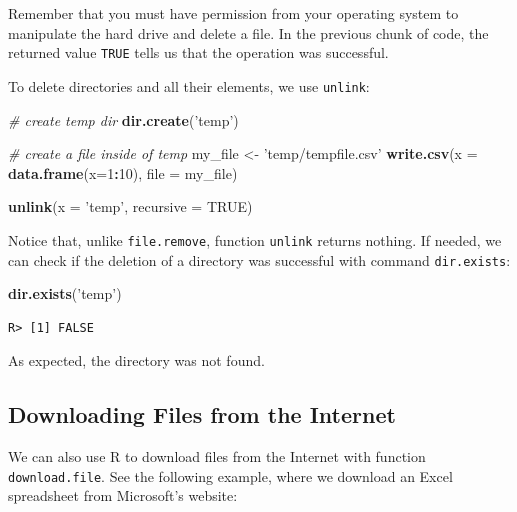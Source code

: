 \documentclass[
  12pt,
]{book}
\newenvironment{Shaded}{\begin{snugshade}}{\end{snugshade}}
\newcommand{\CommentTok}[1]{\textcolor[rgb]{0.37,0.37,0.37}{\textit{#1}}}
\newcommand{\DataTypeTok}[1]{\textcolor[rgb]{0.27,0.27,0.27}{#1}}
\newcommand{\DecValTok}[1]{\textcolor[rgb]{0.06,0.06,0.06}{#1}}
\newcommand{\KeywordTok}[1]{\textcolor[rgb]{0.27,0.27,0.27}{\textbf{#1}}}
\newcommand{\NormalTok}[1]{#1}
\newcommand{\OperatorTok}[1]{\textcolor[rgb]{0.43,0.43,0.43}{\textbf{#1}}}
\newcommand{\OtherTok}[1]{\textcolor[rgb]{0.37,0.37,0.37}{#1}}
\newcommand{\StringTok}[1]{\textcolor[rgb]{0.5,0.5,0.5}{#1}}
\begin{document}
Remember that you must have permission from your operating system to manipulate the hard drive and delete a file. In the previous chunk of code, the returned value \texttt{TRUE} tells us that the operation was successful.

To delete directories and all their elements, we use \texttt{unlink}:

\begin{Shaded}
\begin{Highlighting}[]
\CommentTok{# create temp dir}
\KeywordTok{dir.create}\NormalTok{(}\StringTok{'temp'}\NormalTok{)}

\CommentTok{# create a file inside of temp}
\NormalTok{my_file <-}\StringTok{ 'temp/tempfile.csv'}
\KeywordTok{write.csv}\NormalTok{(}\DataTypeTok{x =} \KeywordTok{data.frame}\NormalTok{(}\DataTypeTok{x=}\DecValTok{1}\OperatorTok{:}\DecValTok{10}\NormalTok{),}
          \DataTypeTok{file =}\NormalTok{ my_file)}

\KeywordTok{unlink}\NormalTok{(}\DataTypeTok{x =} \StringTok{'temp'}\NormalTok{, }\DataTypeTok{recursive =} \OtherTok{TRUE}\NormalTok{)}
\end{Highlighting}
\end{Shaded}

Notice that, unlike \texttt{file.remove}, function \texttt{unlink} returns nothing. If needed, we can check if the deletion of a directory was successful with command \texttt{dir.exists}:

\begin{Shaded}
\begin{Highlighting}[]
\KeywordTok{dir.exists}\NormalTok{(}\StringTok{'temp'}\NormalTok{)}
\end{Highlighting}
\end{Shaded}

\begin{verbatim}
R> [1] FALSE
\end{verbatim}

As expected, the directory was not found.

\hypertarget{downloading-files-from-the-internet}{%
\subsection{Downloading Files from the Internet}\label{downloading-files-from-the-internet}}

We can also use R to download files from the Internet with function \texttt{download.file}. See the following example, where we download an Excel spreadsheet from Microsoft's website:
\end{document}
